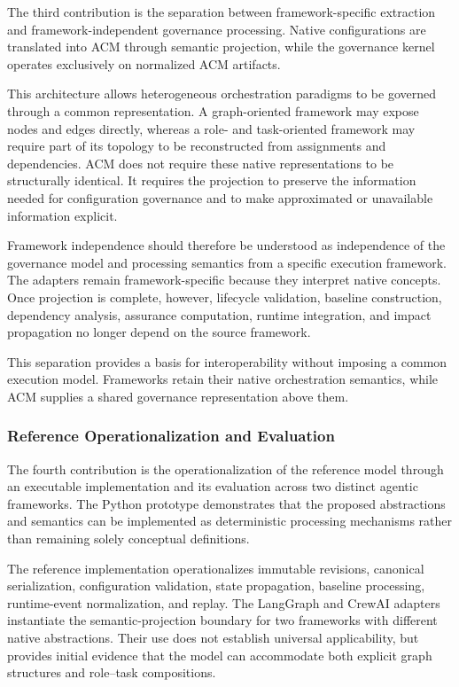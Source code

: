 \documentclass[10pt]{article}
\begin{document}
The third contribution is the separation between framework-specific extraction and framework-independent governance processing. Native configurations are translated into ACM through semantic projection, while the governance kernel operates exclusively on normalized ACM artifacts.

This architecture allows heterogeneous orchestration paradigms to be governed through a common representation. A graph-oriented framework may expose nodes and edges directly, whereas a role- and task-oriented framework may require part of its topology to be reconstructed from assignments and dependencies. ACM does not require these native representations to be structurally identical. It requires the projection to preserve the information needed for configuration governance and to make approximated or unavailable information explicit.

Framework independence should therefore be understood as independence of the governance model and processing semantics from a specific execution framework. The adapters remain framework-specific because they interpret native concepts. Once projection is complete, however, lifecycle validation, baseline construction, dependency analysis, assurance computation, runtime integration, and impact propagation no longer depend on the source framework.

This separation provides a basis for interoperability without imposing a common execution model. Frameworks retain their native orchestration semantics, while ACM supplies a shared governance representation above them.

\subsubsection{Reference Operationalization and Evaluation}

The fourth contribution is the operationalization of the reference model through an executable implementation and its evaluation across two distinct agentic frameworks. The Python prototype demonstrates that the proposed abstractions and semantics can be implemented as deterministic processing mechanisms rather than remaining solely conceptual definitions.

The reference implementation operationalizes immutable revisions, canonical serialization, configuration validation, state propagation, baseline processing, runtime-event normalization, and replay. The LangGraph and CrewAI adapters instantiate the semantic-projection boundary for two frameworks with different native abstractions. Their use does not establish universal applicability, but provides initial evidence that the model can accommodate both explicit graph structures and role--task compositions.
\end{document}
